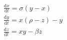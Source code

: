 \documentclass[preview]{standalone}
\begin{document}
\begin{align*}
\frac{\mathrm{d}  x }{\mathrm{d} t} = \sigma ( y  -  x ) \\
            \frac{\mathrm{d}  y }{\mathrm{d} t} =  x  (\rho -  z ) -  y  \\
            \frac{\mathrm{d}  z }{\mathrm{d} t} =  x   y  - \beta  z
\end{align*}
\end{document}
